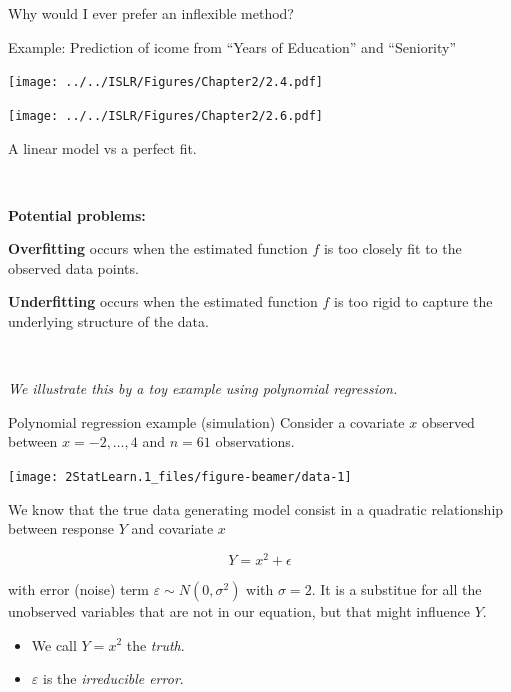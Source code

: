 \documentclass[
  ignorenonframetext,
]{beamer}
\providecommand{\tightlist}{%
  \setlength{\itemsep}{0pt}\setlength{\parskip}{0pt}}
\begin{document}
\begin{frame}
\begin{block}{Why would I ever prefer an inflexible method?}
\protect\hypertarget{why-would-i-ever-prefer-an-inflexible-method}{}
\(~\)

Example: Prediction of icome from ``Years of Education'' and
``Seniority''\vspace{2mm}

\centering

\texttt{[image: ../../ISLR/Figures/Chapter2/2.4.pdf]}

\texttt{[image: ../../ISLR/Figures/Chapter2/2.6.pdf]}

A linear model vs a perfect fit.
\end{block}
\end{frame}

\begin{frame}
\(~\)

\textbf{Potential problems:}

\textbf{Overfitting} occurs when the estimated function \(f\) is too
closely fit to the observed data points.

\textbf{Underfitting} occurs when the estimated function \(f\) is too
rigid to capture the underlying structure of the data.

\(~\)

\emph{We illustrate this by a toy example using polynomial regression.}
\end{frame}

\begin{frame}
\begin{block}{Polynomial regression example (simulation)}
\protect\hypertarget{polynomial-regression-example-simulation}{}
Consider a covariate \(x\) observed between \(x=-2, \ldots , 4\) and
\(n=61\) observations.

\begin{center}\texttt{[image: 2StatLearn.1\_files/figure-beamer/data-1]} \end{center}
\end{block}
\end{frame}

\begin{frame}
We know that the true data generating model consist in a quadratic
relationship between response \(Y\) and covariate \(x\)

\[ Y=x^2 + \epsilon\]

with error (noise) term \(\varepsilon\sim N(0,\sigma^2)\) with
\(\sigma=2\). It is a substitue for all the unobserved variables that
are not in our equation, but that might influence \(Y\).

\begin{itemize}
\tightlist
\item
  We call \(Y=x^2\) the \emph{truth}.
\item
  \(\varepsilon\) is the \emph{irreducible error}.
\end{itemize}
\end{frame}
\end{document}

